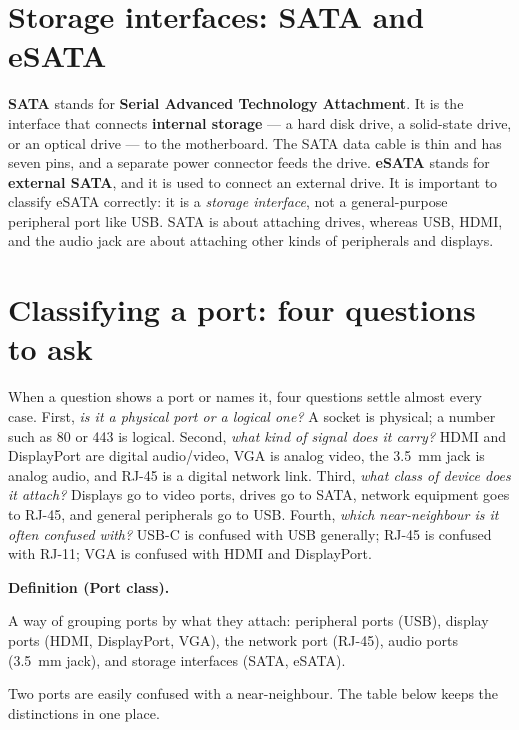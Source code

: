 \documentclass[11pt]{article}
\newenvironment{definitionbox}[1]{%
  \par\noindent\textbf{Definition (#1).}\ \itshape
}{\par\vspace{0.3em}}
\begin{document}
\section{Storage interfaces: SATA and eSATA}
\textbf{SATA} stands for \textbf{Serial Advanced Technology Attachment}. It
is the interface that connects \textbf{internal storage} --- a hard disk
drive, a solid-state drive, or an optical drive --- to the motherboard. The
SATA data cable is thin and has seven pins, and a separate power connector
feeds the drive. \textbf{eSATA} stands for \textbf{external SATA}, and it is
used to connect an external drive. It is important to classify eSATA
correctly: it is a \emph{storage interface}, not a general-purpose peripheral
port like USB. SATA is about attaching drives, whereas USB, HDMI, and the
audio jack are about attaching other kinds of peripherals and displays.

\section{Classifying a port: four questions to ask}
When a question shows a port or names it, four questions settle almost every
case. First, \emph{is it a physical port or a logical one?} A socket is
physical; a number such as 80 or 443 is logical. Second, \emph{what kind of
signal does it carry?} HDMI and DisplayPort are digital audio/video, VGA is
analog video, the 3.5~mm jack is analog audio, and RJ-45 is a digital network
link. Third, \emph{what class of device does it attach?} Displays go to
video ports, drives go to SATA, network equipment goes to RJ-45, and general
peripherals go to USB. Fourth, \emph{which near-neighbour is it often
confused with?} USB-C is confused with USB generally; RJ-45 is confused with
RJ-11; VGA is confused with HDMI and DisplayPort.

\begin{definitionbox}{Port class}
A way of grouping ports by what they attach: peripheral ports (USB), display
ports (HDMI, DisplayPort, VGA), the network port (RJ-45), audio ports (3.5~mm
jack), and storage interfaces (SATA, eSATA).
\end{definitionbox}

Two ports are easily confused with a near-neighbour. The table below keeps the
distinctions in one place.
\end{document}
